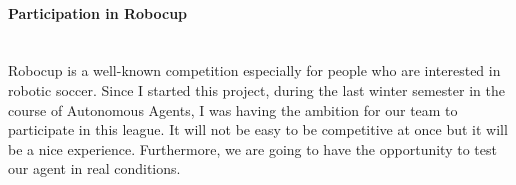 \paragraph{Participation in Robocup}\mbox{} \\
Robocup is a well-known competition especially for people who are interested in robotic soccer. Since I started this project, during the last winter semester in the course of Autonomous Agents, I was having the ambition for our team to participate in this league. It will not be easy to be competitive at once but it will be a nice experience. Furthermore, we are going to have the opportunity to test our agent in real conditions.
 


